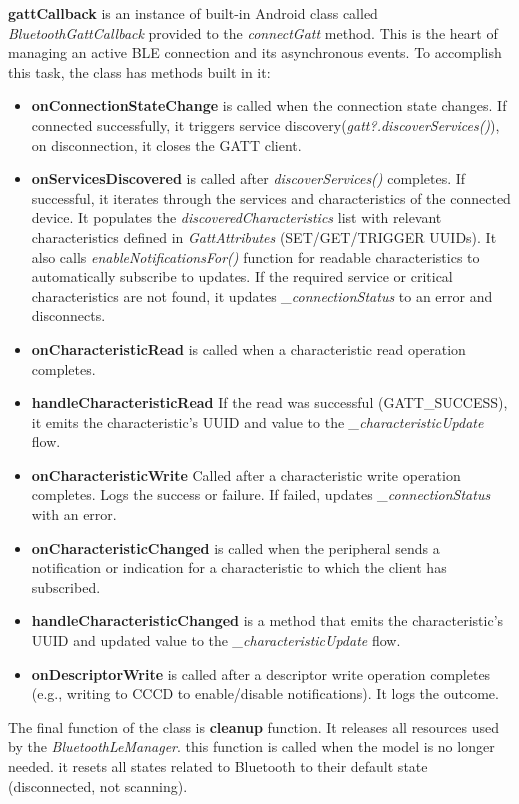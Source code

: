 \textbf{gattCallback} is an instance of built-in Android class called \textit{BluetoothGattCallback}\cite{android_bluetooth} provided to the \textit{connectGatt} method. This is the heart of managing an active \ac{BLE} connection and its asynchronous events. To accomplish this task, the class has methods built in it:
\begin{itemize}
	\item \textbf{onConnectionStateChange} is called when the connection state changes. If connected successfully, it triggers service discovery(\textit{gatt?.discoverServices()}), on disconnection, it closes the \ac{GATT} client.
	\item \textbf{onServicesDiscovered} is called after \textit{discoverServices()} completes. If successful, it iterates through the services and characteristics of the connected device. It populates the \textit{discoveredCharacteristics} list with relevant characteristics defined in \textit{GattAttributes} (SET/GET/TRIGGER UUIDs). It also calls \textit{enableNotificationsFor()} function for readable characteristics to automatically subscribe to updates. If the required service or critical characteristics are not found, it updates \textit{\_connectionStatus} to an error and disconnects.
	\item \textbf{onCharacteristicRead} is called when a characteristic read operation completes. 
	\item \textbf{handleCharacteristicRead} If the read was successful (GATT\_SUCCESS), it emits the characteristic's \ac{UUID} and value to the \textit{\_characteristicUpdate} flow.
	\item \textbf{onCharacteristicWrite} Called after a characteristic write operation completes. Logs the success or failure. If failed, updates \textit{\_connectionStatus} with an error.
	\item \textbf{onCharacteristicChanged} is called when the peripheral sends a notification or indication for a characteristic to which the client has subscribed. 
	\item \textbf{handleCharacteristicChanged} is a method that emits the characteristic's \ac{UUID} and updated value to the \textit{\_characteristicUpdate} flow.
	\item \textbf{onDescriptorWrite} is called after a descriptor write operation completes (e.g., writing to CCCD to enable/disable notifications). It logs the outcome.
\end{itemize}
The final function of the class is \textbf{cleanup} function. It releases all resources used by the \textit{BluetoothLeManager}. this function is called when the model is no longer needed. it resets all states related to Bluetooth to their default state (disconnected, not scanning).
